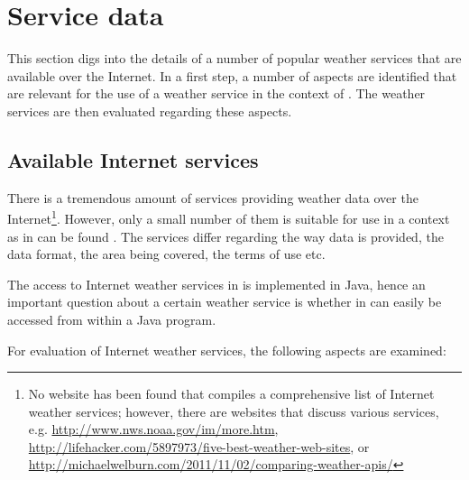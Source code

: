 
\section{Service data}
\label{sec:weather_services}

This section digs into the details of a number of popular weather services that are available over the Internet. In a first step, a number of aspects are identified that are relevant for the use of a weather service in the context of \thinkhome. The weather services are then evaluated regarding these aspects.

\subsection{Available Internet services}
\label{sec:internet_services}

There is a tremendous amount of services providing weather data over the Internet\footnote{No website has been found that compiles a comprehensive list of Internet weather services; however, there are websites that discuss various services, e.g. \url{http://www.nws.noaa.gov/im/more.htm}, \url{http://lifehacker.com/5897973/five-best-weather-web-sites}, or \url{http://michaelwelburn.com/2011/11/02/comparing-weather-apis/}}. However, only a small number of them is suitable for use in a context as in can be found \thinkhome. The services differ regarding the way data is provided, the data format, the area being covered, the terms of use etc.

The access to Internet weather services in \thinkhome is implemented in Java, hence an important question about a certain weather service is whether in can easily be accessed from within a Java program.

For evaluation of Internet weather services, the following aspects are examined:

